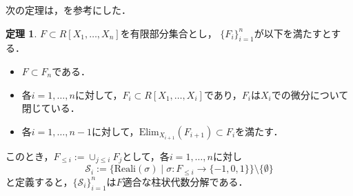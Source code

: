 \documentclass[uplatex, dvipdfmx]{jsarticle}
\numberwithin{equation}{section}
\newcommand{\calS}{\mathcal{S}}
\newcommand{\Elim}{\mathrm{Elim}}
\newcommand{\Reali}{\mathrm{Reali}}
\newcommand{\map}[3]{{#1}\colon{#2}\rightarrow{#3}}
\theoremstyle{definition}
\newtheorem{theorem}[definition]{定理}
\begin{document}
次の定理は，\cite[Theorem 5.34.]{MR2248869}を参考にした．
\begin{theorem}
     $F \subset R[X_1, \dots, X_n]$を有限部分集合とし，
     $\{F_i\}_{i=1}^n$が以下を満たすとする．
     \begin{itemize}
          \item $F \subset F_n$である．\\
          \item 各$i=1,\dots, n$に対して，$F_i \subset R[X_1, \dots, X_i]$であり，$F_i$は$X_i$での微分について閉じている．\\
          \item 各$i=1, \dots, n-1$に対して，$\Elim_{X_{i+1}}(F_{i+1}) \subset F_i$を満たす．
     \end{itemize}

     このとき，$F_{\leq i}:=\cup_{j \leq i} F_j$として，各$i=1, \dots, n$に対し
     \begin{equation}
          \calS_i := \{\Reali(\sigma) \mid \map{\sigma}{F_{\leq i}}{\{-1,0,1\}}\} \setminus \{\emptyset\}
     \end{equation}          
     と定義すると，$\{\calS_i\}_{i=1}^n$は$F$適合な柱状代数分解である．
\end{theorem}
\end{document}
